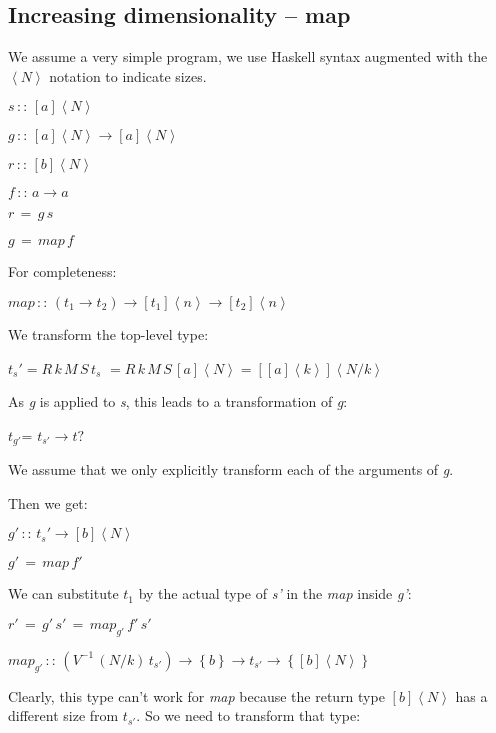 \documentclass{article}
\newenvironment{lyxcode}
{\par\begin{list}{}{
\setlength{\rightmargin}{\leftmargin}
\setlength{\listparindent}{0pt}\raggedright
\setlength{\itemsep}{0pt}
\setlength{\parsep}{0pt}
\normalfont\ttfamily}\item[]}
{\end{list}}
\begin{document}
\subsection{Increasing dimensionality -- map}

We assume a very simple program, we use Haskell syntax \cite{hudak1992report} augmented with
the \texttt{$\left\langle N\right\rangle $} notation to indicate
sizes.
\begin{lyxcode}
$s\,::\,[a]\left\langle N\right\rangle $

$g\,::\,[a]\left\langle N\right\rangle \rightarrow[a]\left\langle N\right\rangle $

$r\,::\,[b]\left\langle N\right\rangle $

$f\,::\, a\rightarrow a$

$r\,=\, g\, s$

$g\,=\, map\, f$
\end{lyxcode}
For completeness:
\begin{lyxcode}
$map\,::\,(t_{1}\rightarrow t_{2})\rightarrow[t_{1}]\left\langle n\right\rangle \rightarrow[t_{2}]\left\langle n\right\rangle $


\end{lyxcode}
We transform the top-level type:

$t_{s}'$\emph{$=R\, k\, M\, S\,$}$t_{s}$ \emph{$=R\, k\, M\, S\,[a]\left\langle N\right\rangle $$=[[a]\left\langle k\right\rangle ]\left\langle N/k\right\rangle $}

As \emph{g} is applied to \emph{s}, this leads to a transformation
of \emph{g}:

$t_{g'}$= $t_{s'}\rightarrow t?$

We assume that we only explicitly transform each of the arguments
of \emph{g}.

Then we get:
\begin{lyxcode}

$g'\,::\, t_{s}'\rightarrow[b]\left\langle N\right\rangle $

$g'\,=\, map\, f'$

\end{lyxcode}
We can substitute $t_{1}$ by the actual type of \emph{s' }in the
\emph{map} inside \emph{g'}:
\begin{lyxcode}
$r'\,=\, g'\, s'\,=\, map_{g'}\, f'\, s'$

$map_{g'}\,::\,\left(V^{-1}\,(N/k)\, t_{s'}\right)\rightarrow\left\{ b\right\} \rightarrow t_{s'}\rightarrow\left\{ [b]\left\langle N\right\rangle \right\} $


\end{lyxcode}
Clearly, this type can't work for \emph{map} because the return type
\emph{$[b]\left\langle N\right\rangle $} has a different size from
$t_{s'}$. So we need to transform that type:
\end{document}
